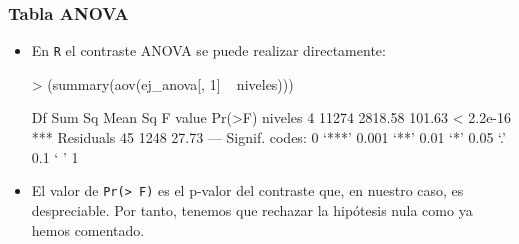 \begin{frame}[fragile]
\frametitle{Tabla ANOVA}
\begin{itemize}
\item<2->  En {\tt R} el contraste ANOVA se puede realizar directamente:

{\footnotesize
\begin{Schunk}
\begin{Sinput}
> (summary(aov(ej_anova[, 1] ~ niveles)))
\end{Sinput}
\begin{Soutput}
            Df Sum Sq Mean Sq F value    Pr(>F)    
niveles      4  11274 2818.58  101.63 < 2.2e-16 ***
Residuals   45   1248   27.73                      
---
Signif. codes:  0 ‘***’ 0.001 ‘**’ 0.01 ‘*’ 0.05 ‘.’ 0.1 ‘ ’ 1 
\end{Soutput}
\end{Schunk}
}

\item<3-> El valor de {\tt Pr(> F)} es el p-valor del contraste que, en nuestro caso, es despreciable. Por tanto, tenemos que rechazar la hipótesis nula como ya hemos comentado.
\end{itemize}
\end{frame}

